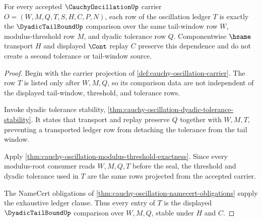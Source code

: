 \begin{theorem}
\label{thm:cauchy-oscillation-dyadic-tail-exactness}
For every accepted $\CauchyOscillationUp$ carrier $O=(W,M,Q,T,S,H,C,P,N)$, each row of the oscillation ledger $T$ is exactly the $\DyadicTailBoundUp$ comparison over the same tail-window row $W$, modulus-threshold row $M$, and dyadic tolerance row $Q$. Componentwise $\hsame$ transport $H$ and displayed $\Cont$ replay $C$ preserve this dependence and do not create a second tolerance or tail-window source.
\end{theorem}
\begin{proof}
Begin with the carrier projection of \autoref{def:cauchy-oscillation-carrier}. The row $T$ is listed only after $W,M,Q$, so its comparison data are not independent of the displayed tail-window, threshold, and tolerance rows.

Invoke dyadic tolerance stability, \autoref{thm:cauchy-oscillation-dyadic-tolerance-stability}. It states that transport and replay preserve $Q$ together with $W,M,T$, preventing a transported ledger row from detaching the tolerance from the tail window.

Apply \autoref{thm:cauchy-oscillation-modulus-threshold-exactness}. Since every modulus-root consumer reads $W,M,Q,T$ before the seal, the threshold and dyadic tolerance used in $T$ are the same rows projected from the accepted carrier.

The NameCert obligations of \autoref{thm:cauchy-oscillation-namecert-obligations} supply the exhaustive ledger clause. Thus every entry of $T$ is the displayed $\DyadicTailBoundUp$ comparison over $W,M,Q$, stable under $H$ and $C$.
\end{proof}

